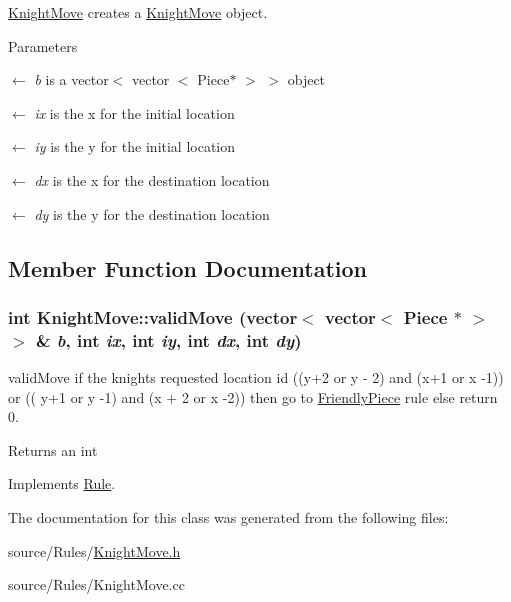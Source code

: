 \hyperlink{classKnightMove}{KnightMove} creates a \hyperlink{classKnightMove}{KnightMove} object. 
\begin{DoxyParams}{Parameters}
\item[\mbox{$\leftarrow$} {\em b}]is a vector$<$ vector $<$ Piece$\ast$ $>$ $>$ object \item[\mbox{$\leftarrow$} {\em ix}]is the x for the initial location \item[\mbox{$\leftarrow$} {\em iy}]is the y for the initial location \item[\mbox{$\leftarrow$} {\em dx}]is the x for the destination location \item[\mbox{$\leftarrow$} {\em dy}]is the y for the destination location \end{DoxyParams}


\subsection{Member Function Documentation}
\hypertarget{classKnightMove_a0bf2d52e9202f4662d7920321bd0c81a}{
\subsubsection[{validMove}]{\setlength{\rightskip}{0pt plus 5cm}int KnightMove::validMove (vector$<$ vector$<$ {\bf Piece} $\ast$ $>$ $>$ \& {\em b}, \/  int {\em ix}, \/  int {\em iy}, \/  int {\em dx}, \/  int {\em dy})}}
\label{classKnightMove_a0bf2d52e9202f4662d7920321bd0c81a}


validMove if the knights requested location id ((y+2 or y -\/ 2) and (x+1 or x -\/1)) or (( y+1 or y -\/1) and (x + 2 or x -\/2)) then go to \hyperlink{classFriendlyPiece}{FriendlyPiece} rule else return 0. \begin{DoxyReturn}{Returns}
an int 
\end{DoxyReturn}


Implements \hyperlink{classRule}{Rule}.

The documentation for this class was generated from the following files:\begin{DoxyCompactItemize}
\item 
source/Rules/\hyperlink{KnightMove_8h}{KnightMove.h}\item 
source/Rules/KnightMove.cc\end{DoxyCompactItemize}
